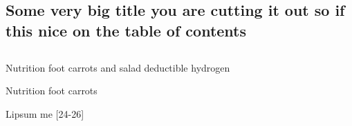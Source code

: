 

\begin{englishtext}

    \chapter
    [Some very big title]
    {Some very big title you are cutting it out so if this nice on the table of contents}

    \begin{flushright}

    \end{flushright}

    \section[Some encoding tests]{ }

    Nutrition foot carrots and salad deductible hydrogen

    Nutrition foot carrots

    Lipsum me [24-26]

    \newpage

\end{englishtext}

